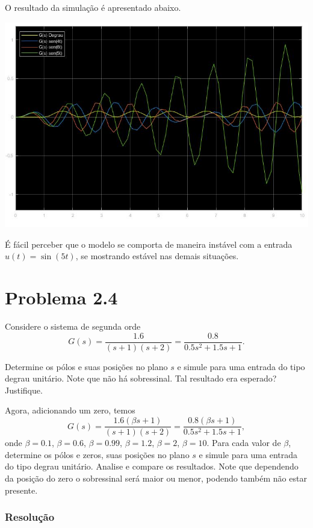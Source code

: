 \documentclass[
]{book}
\theoremstyle{definition}
\theoremstyle{definition}
\theoremstyle{definition}
\theoremstyle{remark}
\begin{document}
O resultado da simulação é apresentado abaixo.

\includegraphics{Imagens/Lab2/prob3Sim.jpg}

É fácil perceber que o modelo se comporta de maneira instável com a entrada \(u(t) = \sin(5t)\), se mostrando estável nas demais situações.

\hypertarget{problema-2.4}{%
\section*{Problema 2.4}\label{problema-2.4}}

Considere o sistema de segunda orde
\[
G(s) = \frac {1.6}{(s+1)(s+2)} = \frac {0.8}{0.5s^2+1.5s+1}.
\]

Determine os pólos e suas posições no plano \(s\) e simule para uma entrada do tipo degrau unitário. Note que não há sobressinal. Tal resultado era esperado? Justifique.

Agora, adicionando um zero, temos
\[
G(s) = \frac {1.6(\beta s+1)}{(s+1)(s+2)} = \frac {0.8(\beta s+1)}{0.5s^2 +1.5s +1},
\]
onde \(\beta = 0.1\), \(\beta = 0.6\), \(\beta = 0.99\), \(\beta = 1.2\), \(\beta = 2\), \(\beta = 10\). Para cada valor de \(\beta\), determine os pólos e zeros, suas posições no plano \(s\) e simule para uma entrada do tipo degrau unitário. Analise e compare os resultados. Note que dependendo da posição do zero o sobressinal será maior ou menor, podendo também não estar presente.

\hypertarget{resoluuxe7uxe3o-3}{%
\subsubsection*{Resolução}\label{resoluuxe7uxe3o-3}}
\end{document}

